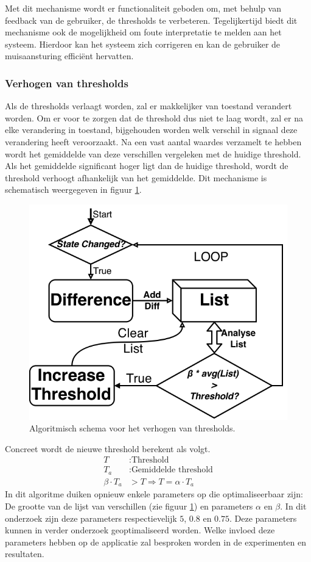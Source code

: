 \documentclass{article}
\newcommand{\figwidth}{0.85\linewidth}
\begin{document}
Met dit mechanisme wordt er functionaliteit geboden om, met behulp van feedback van de gebruiker, de thresholds te verbeteren. Tegelijkertijd biedt dit mechanisme ook de mogelijkheid om foute interpretatie te melden aan het systeem. Hierdoor kan het systeem zich corrigeren en kan de gebruiker de muisaansturing effici\"ent hervatten.

\subsubsection*{Verhogen van thresholds}\label{sec:verhogenthres}
Als de thresholds verlaagt worden, zal er makkelijker van toestand verandert worden. Om er voor te zorgen dat de threshold dus niet te laag wordt, zal er na elke verandering in toestand, bijgehouden worden welk verschil in signaal deze verandering heeft veroorzaakt. Na een vast aantal waardes verzamelt te hebben wordt het gemiddelde van deze verschillen vergeleken met de huidige threshold. Als het gemiddelde significant hoger ligt dan de huidige threshold, wordt de threshold verhoogt afhankelijk van het gemiddelde. Dit mechanisme is schematisch weergegeven in figuur \ref{fig:algothresholdup}.\\
\begin{figure}[H]
	\centering
	\includegraphics[width=\figwidth]{images/thresholdtrainerup_bw}
	\caption{Algoritmisch schema voor het verhogen van thresholds.}
	\label{fig:algothresholdup}
\end{figure}
Concreet wordt de nieuwe threshold berekent als volgt.
\begin{align*}
	T&: \text{Threshold}\\
	T_a&: \text{Gemiddelde threshold}\\
	\beta \cdot T_a &> T \Rightarrow T = \alpha \cdot T_a
\end{align*}
In dit algoritme duiken opnieuw enkele parameters op die optimaliseerbaar zijn: De grootte van de lijst van verschillen (zie figuur \ref{fig:algothresholdup}) en parameters $\alpha$ en $\beta$. In dit onderzoek zijn deze parameters respectievelijk $5$, $0.8$ en $0.75$. Deze parameters kunnen in verder onderzoek geoptimaliseerd worden. Welke invloed deze parameters hebben op de applicatie zal besproken worden in de experimenten en resultaten.
\end{document}
